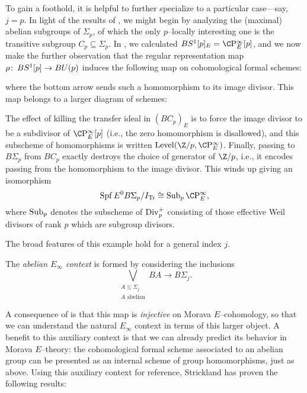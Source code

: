 \begin{example}
To gain a foothold, it is helpful to further specialize to a particular case---say, $j = p$.  In light of the results of , we might begin by analyzing the (maximal) abelian subgroups of $\Sigma_p$, of which the only $p$--locally interesting one is the transitive subgroup $C_p \subseteq \Sigma_p$.  In , we calculated $BS^1[p]_E = \CP^\infty_E[p]$, and we now make the further observation that the regular representation map $\rho\colon\thinspace BS^1[p] \to BU(p)$ induces the following map on cohomological formal schemes:
\begin{center}
\end{center}
where the bottom arrow sends such a homomorphism to its image divisor.  This map belongs to a larger diagram of schemes:
\begin{center}
\end{center}
The effect of killing the transfer ideal in $(BC_p)_E$ is to force the image divisor to be a subdivisor of $\CP^\infty_E[p]$ (i.e., the zero homomorphism is disallowed), and this subscheme of homomorphisms is written $\Level(\Z/p, \CP^\infty_E)$.  Finally, passing to $B\Sigma_p$ from $BC_p$ exactly destroys the choice of generator of $\Z/p$, i.e., it encodes passing from the homomorphism to the image divisor.  This winds up giving an isomorphism \[\Spf E^0 B\Sigma_p / I_{\Tr} \cong \Sub_p \CP^\infty_E,\] where $\operatorname{Sub}_p$ denotes the subscheme of $\operatorname{Div}_p^+$ consisting of those effective Weil divisors of rank $p$ which are subgroup divisors.
\end{example}

The broad features of this example hold for a general index $j$.
\begin{definition}
The \textit{abelian $E_\infty$ context} is formed by considering the inclusions \[\bigvee_{\substack{A \le \Sigma_j \\ \text{$A$ abelian}}} BA \to B\Sigma_j.\]
\end{definition}
\noindent A consequence of  is that this map is \emph{injective} on Morava $E$--cohomology, so that we can understand the natural $E_\infty$ context in terms of this larger object.  A benefit to this auxiliary context is that we can already predict its behavior in Morava $E$--theory: the cohomological formal scheme associated to an abelian group can be presented as an internal scheme of group homomorphisms, just as above.  Using this auxiliary context for reference, Strickland has proven the following results:

